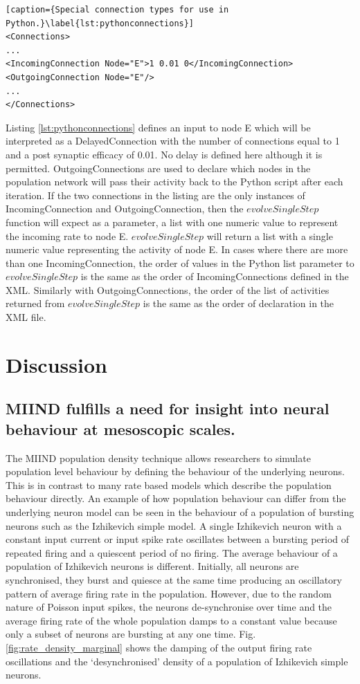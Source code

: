 \documentclass[utf8]{frontiersSCNS} %
\begin{document}
\begin{lstlisting}[caption={Special connection types for use in Python.}\label{lst:pythonconnections}]
<Connections>
...
<IncomingConnection Node="E">1 0.01 0</IncomingConnection>
<OutgoingConnection Node="E"/>
...
</Connections>
\end{lstlisting}

Listing \ref{lst:pythonconnections} defines an input to node E which will be interpreted as a DelayedConnection with the number of connections equal to 1 and a post synaptic efficacy of 0.01. No delay is defined here although it is permitted. OutgoingConnections are used to declare which nodes in the population network will pass their activity back to the Python script after each iteration. If the two connections in the listing are the only instances of IncomingConnection and OutgoingConnection, then the $evolveSingleStep$ function will expect as a parameter, a list with one numeric value to represent the incoming rate to node E. $evolveSingleStep$ will return a list with a single numeric value representing the activity of node E. In cases where there are more than one IncomingConnection, the order of values in the Python list parameter to $evolveSingleStep$ is the same as the order of IncomingConnections defined in the XML. Similarly with OutgoingConnections, the order of the list of activities returned from $evolveSingleStep$ is the same as the order of declaration in the XML file.

\section{Discussion}

\subsection*{MIIND fulfills a need for insight into neural behaviour at mesoscopic scales.}
The MIIND population density technique allows researchers to simulate population level behaviour by defining the behaviour of the underlying neurons. This is in contrast to many rate based models which describe the population behaviour directly. An example of how population behaviour can differ from the underlying neuron model can be seen in the behaviour of a population of bursting neurons such as the Izhikevich simple model. A single Izhikevich neuron with a constant input current or input spike rate oscillates between a bursting period of repeated firing and a quiescent period of no firing. The average behaviour of a population of Izhikevich neurons is different. Initially, all neurons are synchronised, they burst and quiesce at the same time producing an oscillatory pattern of average firing rate in the population. However, due to the random nature of Poisson input spikes, the neurons de-synchronise over time and the average firing rate of the whole population damps to a constant value because only a subset of neurons are bursting at any one time. Fig. \ref{fig:rate_density_marginal} shows the damping of the output firing rate oscillations and the `desynchronised' density of a population of Izhikevich simple neurons.\\ 
\end{document}
